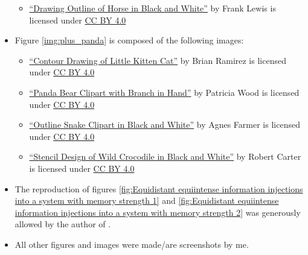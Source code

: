 \documentclass[hidelinks]{scrartcl}
\begin{document}
\begin{itemize}
\begin{itemize}
	\item \href{http://animalsclipart.com/drawing-outline-of-horse-in-black-and-white/}{``Drawing Outline of Horse in Black and White''} by Frank Lewis is licensed under \href{https://creativecommons.org/licenses/by/4.0/}{CC BY 4.0}
	\end{itemize}
\item Figure \ref{img:plus_panda} is composed of the following images:
	\begin{itemize}
	\item \href{http://animalsclipart.com/contour-drawing-of-little-kitten-cat/}{``Contour Drawing of Little Kitten Cat''} by Brian Ramirez is licensed under \href{https://creativecommons.org/licenses/by/4.0/}{CC BY 4.0}
	\item \href{http://animalsclipart.com/panda-bear-clipart-with-branch-in-hand/}{``Panda Bear Clipart with Branch in Hand''} by Patricia Wood is licensed under \href{https://creativecommons.org/licenses/by/4.0/}{CC BY 4.0}
	\item \href{http://animalsclipart.com/outline-snake-clipart-in-black-and-white/}{``Outline Snake Clipart in Black and White''} by Agnes Farmer is licensed under \href{https://creativecommons.org/licenses/by/4.0/}{CC BY 4.0}
	\item \href{http://animalsclipart.com/stencil-design-of-wild-crocodile-in-black-and-white/}{``Stencil Design of Wild Crocodile in Black and White''} by Robert Carter is licensed under \href{https://creativecommons.org/licenses/by/4.0/}{CC BY 4.0}
	\end{itemize}
\item The reproduction of figures \ref{fig:Equidistant equiintense information injections into a system with memory strength 1} and \ref{fig:Equidistant equiintense information injections into a system with memory strength 2} was generously allowed by the author of \cite{Yffelti.2016}.
\item All other figures and images were made/are screenshots by me.
\end{itemize}


\end{document}
